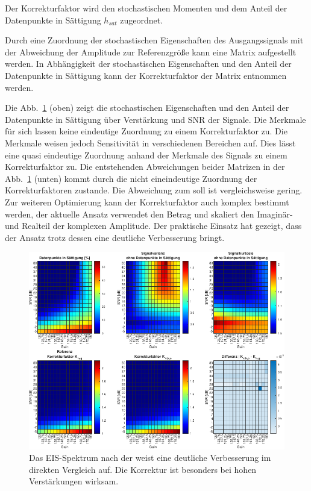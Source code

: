 Der Korrekturfaktor wird den stochastischen Momenten und dem Anteil der Datenpunkte in Sättigung $h_{sat}$ zugeordnet.

Durch eine Zuordnung der stochastischen Eigenschaften des Ausgangssignals mit der Abweichung der Amplitude zur Referenzgröße kann eine Matrix aufgestellt werden. In Abhängigkeit der stochastischen Eigenschaften und den Anteil der Datenpunkte in Sättigung kann der Korrekturfaktor der Matrix entnommen werden. 


Die Abb.~\ref{fig:lut} (oben) zeigt die stochastischen Eigenschaften und den Anteil der Datenpunkte in Sättigung über Verstärkung und SNR der Signale. Die Merkmale für sich lassen keine eindeutige Zuordnung zu einem Korrekturfaktor zu. Die Merkmale weisen jedoch Sensitivität in verschiedenen Bereichen auf. Dies lässt eine quasi eindeutige Zuordnung anhand der Merkmale des Signals zu einem Korrekturfaktor zu. Die entstehenden Abweichungen beider Matrizen in der Abb.~\ref{fig:lut} (unten) kommt durch die nicht eineindeutige Zuordnung der Korrekturfaktoren zustande. Die Abweichung zum soll ist vergleichsweise gering. Zur weiteren Optimierung kann der Korrekturfaktor auch komplex bestimmt werden, der aktuelle Ansatz verwendet den Betrag und skaliert den Imaginär- und Realteil der komplexen Amplitude. Der praktische Einsatz hat gezeigt, dass der Ansatz trotz dessen eine deutliche Verbesserung bringt. 

\begin{figure}[h!]
	\centering
	\includegraphics[width=.9\textwidth]{../img/lut.pdf}
	\caption{Das EIS-Spektrum nach der weist eine deutliche Verbesserung im direkten Vergleich auf. Die Korrektur ist besonders bei hohen Verstärkungen wirksam. }
	\label{fig:lut} 
\end{figure}


